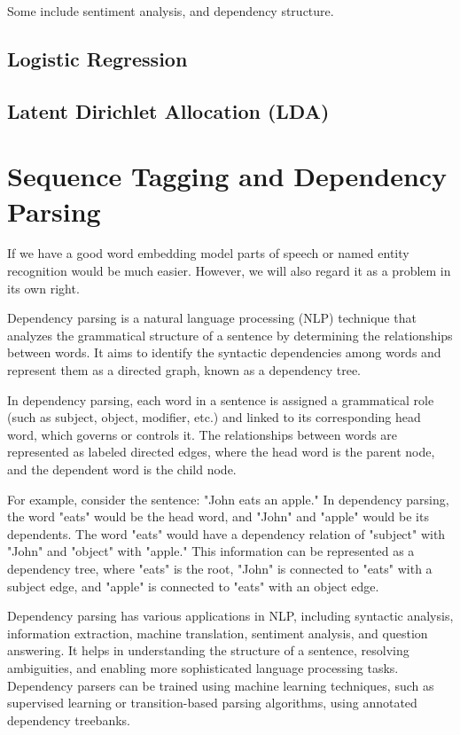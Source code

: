 \documentclass{article}
\begin{document}
  Some include sentiment analysis, and dependency structure. 

  \subsection{Logistic Regression}

  \subsection{Latent Dirichlet Allocation (LDA)}

\section{Sequence Tagging and Dependency Parsing}

  If we have a good word embedding model parts of speech or named entity recognition would be much easier. However, we will also regard it as a problem in its own right. 

  Dependency parsing is a natural language processing (NLP) technique that analyzes the grammatical structure of a sentence by determining the relationships between words. It aims to identify the syntactic dependencies among words and represent them as a directed graph, known as a dependency tree.

  In dependency parsing, each word in a sentence is assigned a grammatical role (such as subject, object, modifier, etc.) and linked to its corresponding head word, which governs or controls it. The relationships between words are represented as labeled directed edges, where the head word is the parent node, and the dependent word is the child node.

  For example, consider the sentence: "John eats an apple." In dependency parsing, the word "eats" would be the head word, and "John" and "apple" would be its dependents. The word "eats" would have a dependency relation of "subject" with "John" and "object" with "apple." This information can be represented as a dependency tree, where "eats" is the root, "John" is connected to "eats" with a subject edge, and "apple" is connected to "eats" with an object edge.

  Dependency parsing has various applications in NLP, including syntactic analysis, information extraction, machine translation, sentiment analysis, and question answering. It helps in understanding the structure of a sentence, resolving ambiguities, and enabling more sophisticated language processing tasks. Dependency parsers can be trained using machine learning techniques, such as supervised learning or transition-based parsing algorithms, using annotated dependency treebanks.
\end{document}
